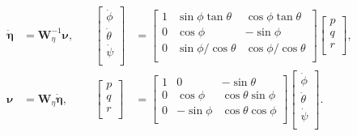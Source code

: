 \documentclass[11pt]{exam}
\begin{document}
        \begin{align}
            \begin{aligned}
                \boldsymbol{\dot{\eta}} &=
                \boldsymbol{W}_{\eta}^{-1}\boldsymbol{\nu},
                &\quad
                \left[{
                    \begin{array}{c}
                        \dot{\phi} \\
                        \dot{\theta} \\
                        \dot{\psi} \\
                    \end{array} 
                }\right] &= 
                \left[{
                    \begin{array}{ccc}
                        1 & \sin{\phi}\tan{\theta} & \cos{\phi}\tan{\theta}     \\
                        0 & \cos{\phi} & -\sin{\phi} \\
                        0 & \sin{\phi}/\cos{\theta} & \cos{\phi}/\cos{\theta} \\
                    \end{array} 
                }\right]
                \left[{
                    \begin{array}{c}
                        p \\
                        q \\
                        r \\
                    \end{array} 
                }\right],
                \\
                \boldsymbol{\nu} &=
                \boldsymbol{W}_{\eta}\boldsymbol{\dot{\eta}},
                &\quad
                \left[{
                    \begin{array}{c}
                        p \\
                        q \\
                        r \\
                    \end{array} 
                }\right] &= 
                \left[{
                    \begin{array}{ccc}
                        1 & 0 & -\sin{\theta}  \\
                        0 & \cos{\phi} & \cos{\theta}\sin{\phi} \\
                        0 & -\sin{\phi} & \cos{\theta}\cos{\phi} \\
                    \end{array} 
                }\right]
                \left[{
                    \begin{array}{c}
                        \dot{\phi} \\
                        \dot{\theta} \\
                        \dot{\psi} \\
                    \end{array} 
                }\right].
            \end{aligned}
        \end{align}
\end{document}
